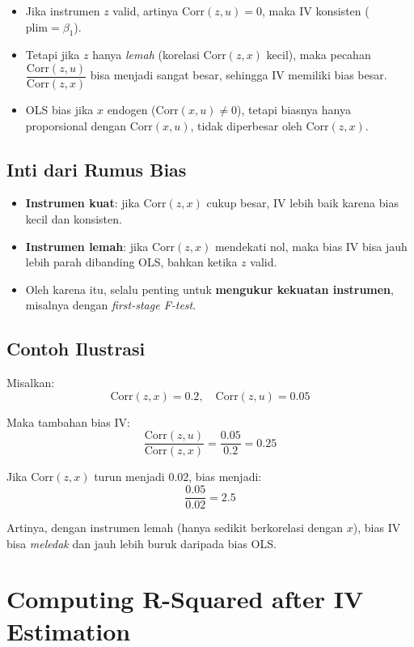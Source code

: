 \documentclass[]{article}
\begin{document}
\begin{itemize}
  \item Jika instrumen $z$ valid, artinya $\text{Corr}(z,u)=0$, maka IV konsisten ($\text{plim} = \beta_1$).
  \item Tetapi jika $z$ hanya \emph{lemah} (korelasi $\text{Corr}(z,x)$ kecil), maka pecahan 
  $\dfrac{\text{Corr}(z,u)}{\text{Corr}(z,x)}$ bisa menjadi sangat besar, sehingga IV memiliki bias besar.
  \item OLS bias jika $x$ endogen ($\text{Corr}(x,u)\neq 0$), tetapi biasnya hanya proporsional dengan $\text{Corr}(x,u)$, tidak diperbesar oleh $\text{Corr}(z,x)$.
\end{itemize}

\subsection*{Inti dari Rumus Bias}

\begin{itemize}
  \item \textbf{Instrumen kuat}: jika $\text{Corr}(z,x)$ cukup besar, IV lebih baik karena bias kecil dan konsisten.
  \item \textbf{Instrumen lemah}: jika $\text{Corr}(z,x)$ mendekati nol, maka bias IV bisa jauh lebih parah dibanding OLS, bahkan ketika $z$ valid.
  \item Oleh karena itu, selalu penting untuk \textbf{mengukur kekuatan instrumen}, misalnya dengan \emph{first-stage F-test}.
\end{itemize}

\subsection*{Contoh Ilustrasi}

Misalkan:
\[
\text{Corr}(z,x) = 0.2, \quad \text{Corr}(z,u)=0.05
\]

Maka tambahan bias IV:
\[
\frac{\text{Corr}(z,u)}{\text{Corr}(z,x)} = \frac{0.05}{0.2} = 0.25
\]

Jika $\text{Corr}(z,x)$ turun menjadi $0.02$, bias menjadi:
\[
\frac{0.05}{0.02} = 2.5
\]

Artinya, dengan instrumen lemah (hanya sedikit berkorelasi dengan $x$), bias IV bisa \emph{meledak} dan jauh lebih buruk daripada bias OLS.


\section{Computing R-Squared after IV Estimation}
\end{document}
